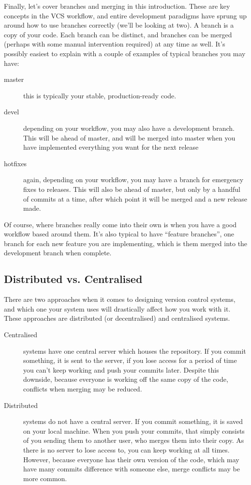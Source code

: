 \documentclass[12pt,a4paper]{article}
\begin{document}
Finally, let's cover branches and merging in this introduction. These
are key concepts in the VCS workflow, and entire development paradigms
have sprung up around how to use branches correctly (we'll be looking
at two). A branch is a copy of your code. Each branch can be distinct,
and branches can be merged (perhaps with some manual intervention
required) at any time as well. It's possibly easiest to explain with
a couple of examples of typical branches you may have:

\begin{description}
  \item[master] this is typically your stable, production-ready
    code.
  \item[devel] depending on your workflow, you may also have a
    development branch. This will be ahead of master, and will be
    merged into master when you have implemented everything you want
    for the next release
  \item[hotfixes] again, depending on your workflow, you may have a
    branch for emergency fixes to releases. This will also be ahead of
    master, but only by a handful of commits at a time, after which
    point it will be merged and a new release made.
\end{description}

Of course, where branches really come into their own is when you have
a good workflow based around them. It's also typical to have ``feature
branches'', one branch for each new feature you are implementing,
which is them merged into the development branch when complete.

\subsection{Distributed vs. Centralised}

There are two approaches when it comes to designing version control
systems, and which one your system uses will drastically affect how
you work with it. These approaches are distributed (or decentralised)
and centralised systems.

\begin{description}
  \item[Centralised] systems have one central server which houses the
    repository. If you commit something, it is sent to the server, if
    you lose access for a period of time you can't keep working and
    push your commits later. Despite this downside, because everyone
    is working off the same copy of the code, conflicts when merging
    may be reduced.
  \item[Distributed] systems do not have a central server. If you
    commit something, it is saved on your local machine. When you
    push your commits, that simply consists of you sending them to
    another user, who merges them into their copy. As there is no
    server to lose access to, you can keep working at all
    times. However, because everyone has their own version of the
    code, which may have many commits difference with someone else,
    merge conflicts may be more common.
\end{description}
\end{document}
